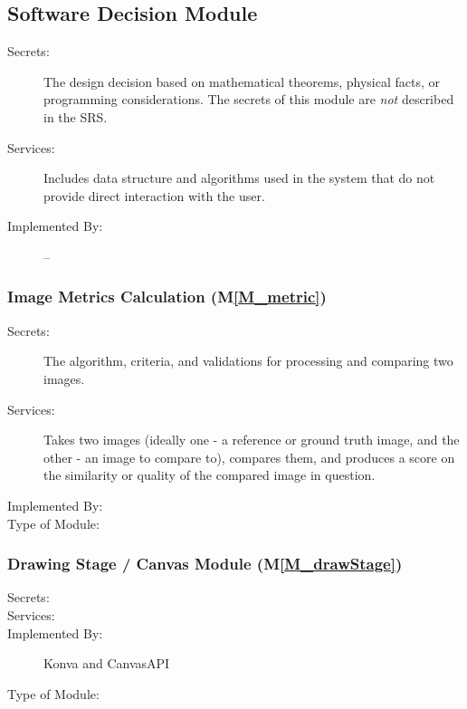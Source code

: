 \documentclass[12pt, titlepage]{article}
\newcommand{\mref}[1]{M\ref{#1}}
\begin{document}
\subsection{Software Decision Module}

\begin{description}
\item[Secrets:] The design decision based on mathematical theorems, physical
  facts, or programming considerations. The secrets of this module are
  \emph{not} described in the SRS.
\item[Services:] Includes data structure and algorithms used in the system that
  do not provide direct interaction with the user. 
\item[Implemented By:] --
\end{description}


\subsubsection{Image Metrics Calculation (\mref{M_metric})}
\begin{description}
\item[Secrets:]The algorithm, criteria, and validations for processing and comparing two images.
\item[Services:]Takes two images (ideally one - a reference or ground truth image, 
and the other - an image to compare to), compares them, and produces a score on the 
similarity or quality of the compared image in question.
\item[Implemented By:] \progname{}
\item[Type of Module:] 
\end{description}


\subsubsection{Drawing Stage / Canvas Module (\mref{M_drawStage})}
\begin{description}
\item[Secrets:] 
\item[Services:] 
\item[Implemented By:] Konva and CanvasAPI
\item[Type of Module:] 
\end{description}
\end{document}
